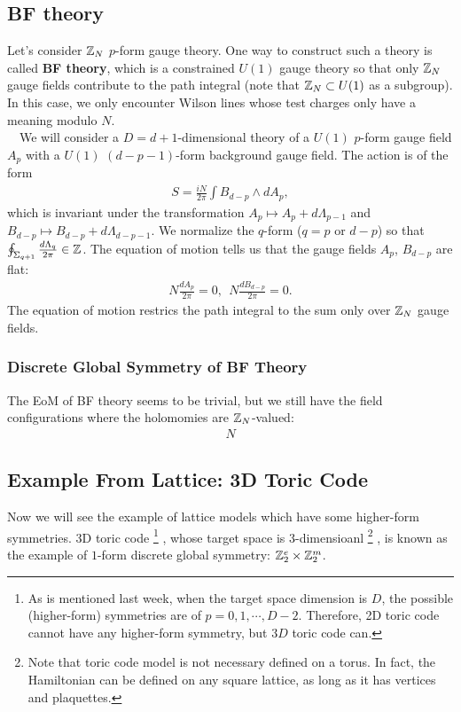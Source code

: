 \documentclass{ltjsarticle}
\theoremstyle{mystyle} %
\numberwithin{equation}{section}
\begin{document}
\subsection{BF theory}
Let's consider $\mathbb{Z}_{N}$ $p$-form gauge theory. 
One way to construct such a theory is called \textbf{BF theory}, 
which is a constrained $U(1)$ gauge theory 
so that only $\mathbb{Z}_N$ gauge fields contribute to the path integral 
(note that $\mathbb{Z}_N \subset U(1)$ as a subgroup). 
In this case, we only encounter Wilson lines whose test charges only have a meaning modulo ${N}$. \\
　We will consider a $D=d+1$-dimensional theory of a $U(1)$ $p$-form gauge field $A_p$ with a $U(1)$ $(d-p-1)$-form background gauge field. 
The action is of the form 
\begin{align}
    S=\frac{iN}{2\pi}\int B_{d-p}\wedge dA_p, 
\end{align}
which is invariant under the transformation 
$A_{p}\mapsto A_p + d\Lambda_{p-1}$ and $B_{d-p}\mapsto B_{d-p} + d \Lambda_{d-p-1}$. 
We normalize the $q$-form ($q=p$ or $d-p$) so that $\oint_{\Sigma_{q+1}}\frac{d\Lambda_q}{2\pi}\in \mathbb{Z}$. 
The equation of motion tells us that the gauge fields $A_p$, $B_{d-p}$ are flat: 
\begin{align}
    N\frac{dA_p}{2\pi} = 0, ~~ N\frac{dB_{d-p}}{2\pi} = 0. 
\end{align}
The equation of motion restrics the path integral to the sum only over $\mathbb{Z}_N$ gauge fields. 
\subsubsection{Discrete Global Symmetry of BF Theory}
The EoM of BF theory seems to be trivial, but we still have the field configurations 
where the holomomies are $\mathbb{Z}_N$-valued: 
\begin{align}
    N
\end{align}
\subsection{Example From Lattice: 3D Toric Code}
Now we will see the example of lattice models which have some higher-form symmetries. 
3D toric code
\footnote{As is mentioned last week, 
when the target space dimension is $D$, 
the possible (higher-form) symmetries are of $p=0, 1, \cdots, D-2$. 
Therefore, 2D toric code cannot have any higher-form symmetry, 
but $3D$ toric code can. }
, whose target space is 3-dimensioanl
\footnote{Note that toric code model is not necessary defined on a torus. 
In fact, the Hamiltonian can be defined on any square lattice, 
as long as it has vertices and plaquettes. }
, is known as the example of $1$-form 
discrete global symmetry: $\mathbb{Z}^{e}_2\times \mathbb{Z}^m_2$. 
\end{document}
